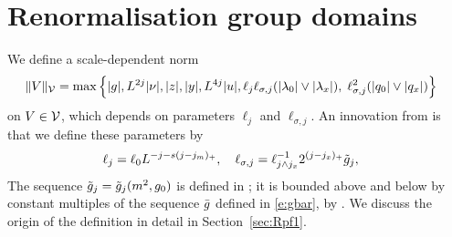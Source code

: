 
\section{Renormalisation group domains}

We define a scale-dependent norm
\begin{equation}
\label{e:Vnormdef}
\begin{aligned}
\|V\|_{\mathcal{V}} &=
\max\Big\{
|g|, L^{2j}|\nu|, |z|, |y|,  L^{4j}|u|,
\ell_j\ell_{\sigma,j}(|\lambda_0|\vee|\lambda_x|),\;
 \ell_{\sigma,j}^{2} (|q_0|\vee|q_x|)
\Big\}
\end{aligned}
\end{equation}
on $V \in \mathcal{V}$, which depends on parameters $\ell_j$ and $\ell_{\sigma,j}$.
An innovation from \cite{BSTW-clp} is that we define these parameters by
\begin{align}
\label{e:elldef-zz}
\ell_j &= \ell_0 L^{-j - s (j - j_m)_+}, \quad
\ell_{\sigma,j}
=
\ell_{j \wedge j_{x}}^{-1} 2^{(j - j_{x})_+} \tilde{g}_j,
\end{align}
The sequence $\tilde{g}_j = \tilde{g}_j(m^2,g_0)$ is defined in
\cite[\eqref{log-e:ggendef}]{BBS-saw4-log};
it is bounded above and below by constant multiples of
the sequence $\bar{g}$ defined in
\eqref{e:gbar},
by
\cite[Lemma~\ref{log-lem:gbarmcomp}]{BBS-saw4-log}.
We discuss the origin of the definition  in detail
in Section~\ref{sec:Rpf1}.

